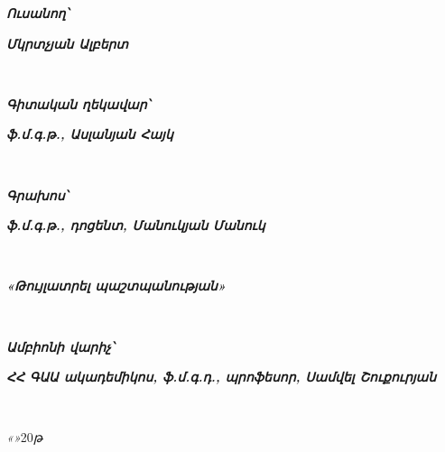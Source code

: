     {
        \linespread{1}
        {
            \large
            \raggedright
            \parbox[t]{2.5cm}{\fontsize{13}{0}\textbf{\textit{Ուսանող՝}}}
            \parbox[t]{0cm}{\underline{\hspace{4cm}} \scriptsize{}} \hfill
            \parbox[t]{9.5cm}{\fontsize{13}{0}\textbf{\textit{Մկրտչյան Ալբերտ}}} \\
        }

        \vspace{2cm}
        {
            \large
            \raggedright
            \parbox[t]{5.2cm}{\fontsize{13}{0}\textbf{\textit{Գիտական ղեկավար՝}}}
            \parbox[t]{0cm}{\underline{\hspace{4cm}} \scriptsize{}} \hfill
            \parbox[t]{6.9cm}{\raggedright\fontsize{13}{0}\textbf{\textit{ֆ.մ.գ.թ., Ասլանյան Հայկ}}} \\
        }

        \vspace{2cm}
        {
            \large
            \raggedright
            \parbox[t]{2.5cm}{\fontsize{13}{0}\textbf{\textit{Գրախոս՝}}}
            \parbox[t]{0cm}{\underline{\hspace{4cm}} \scriptsize{}} \hfill
            \parbox[t]{9.5cm}{\fontsize{13}{0}\textbf{\textit{ֆ.մ.գ.թ., դոցենտ, Մանուկյան Մանուկ}}} \\
        }


        \vfill
        {
            \large
            \raggedright
            \fontsize{13}{0}
            \textbf{\textit{«Թույլատրել պաշտպանության»}}
        } \\

        \vspace{2cm}
        {
            \large
            \raggedright
            \parbox[t]{3.9cm}{\fontsize{13}{0}\textbf{\textit{Ամբիոնի վարիչ՝}}}
            \parbox[t]{2cm}{\underline{\hspace{4cm}} \scriptsize{}} \hfill
            \parbox[t]{8cm}{\raggedright\fontsize{13}{0}\textbf{\textit{ՀՀ ԳԱԱ ակադեմիկոս, ֆ.մ.գ.դ., պրոֆեսոր, Սամվել Շուքուրյան}}} \\
        }

        \vspace{1.5cm}
        {
            \raggedright
            \large
            \textit{«}\underline{\hspace{1.5cm}}\textit{»}\underline{\hspace{2.5cm}}20\underline{\hspace{0.5cm}}\textit{թ} \\
        }

        \newpage
    }